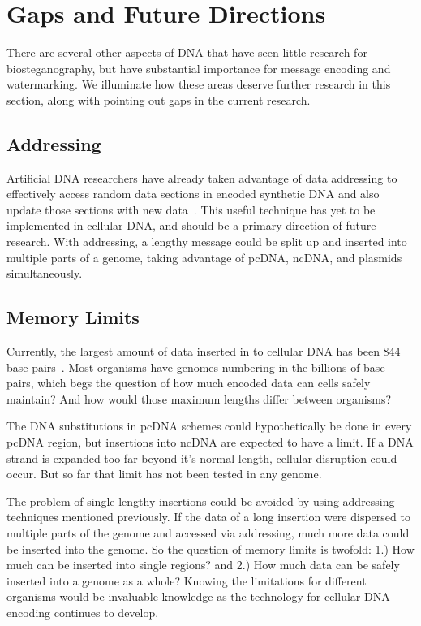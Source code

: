 \documentclass{bioinfo}
\begin{document}
\section{Gaps and Future Directions}

There are several other aspects of DNA that have seen little research for biosteganography, but have substantial importance for message encoding and watermarking. We illuminate how these areas deserve further research in this section, along with pointing out gaps in the current research.

\subsection{Addressing}

Artificial DNA researchers have already taken advantage of data addressing to effectively access random data sections in encoded synthetic DNA and also update those sections with new data~\cite{SG2016BRI}. This useful technique has yet to be implemented in cellular DNA, and should be a primary direction of future research. With addressing, a lengthy message could be split up and inserted into multiple parts of a genome, taking advantage of pcDNA, ncDNA, and plasmids simultaneously.

\subsection{Memory Limits}

Currently, the largest amount of data inserted in to cellular DNA has been 844 base pairs~\cite{AR2009BT}. Most organisms have genomes numbering in the billions of base pairs, which begs the question of how much encoded data can cells safely maintain? And how would those maximum lengths differ between organisms?

The DNA substitutions in pcDNA schemes could hypothetically be done in every pcDNA region, but insertions into ncDNA are expected to have a limit. If a DNA strand is expanded too far beyond it's normal length, cellular disruption could occur. But so far that limit has not been tested in any genome.

The problem of single lengthy insertions could be avoided by using addressing techniques mentioned previously. If the data of a long insertion were dispersed to multiple parts of the genome and accessed via addressing, much more data could be inserted into the genome. So the question of memory limits is twofold: 1.) How much can be inserted into single regions? and 2.) How much data can be safely inserted into a genome as a whole? Knowing the limitations for different organisms would be invaluable knowledge as the technology for cellular DNA encoding continues to develop.
\end{document}
